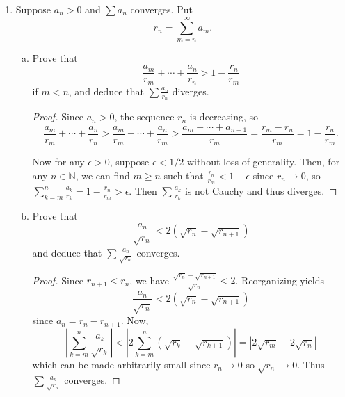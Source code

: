 \documentclass{scrbook}
\newcommand{\N}{\mathbb{N}}
\renewcommand{\to}{\rightarrow}
\begin{document}
\begin{enumerate}
\begin{enumerate}[(a)]
\item What can be said about
\[
	\sum \frac{a_n}{1 + na_n} \text{ and } \sum \frac{a_n}{1 + n^2 a_n} \text{?}
\]

\begin{proof}
The first series converges for some $a_n$ and diverges for some other $a_n$. But $\frac{a_n}{1 + n^2 a_n} < \frac{a_n}{n^2 a_n} = \frac{1}{n^2}$ so the second series converges by the comparison test and the $p$-test.
\end{proof}
\end{enumerate}

\item %
Suppose $a_n > 0$ and $\sum a_n$ converges. Put
\[
	r_n = \sum_{m=n}^{\infty} a_m.
\]
\begin{enumerate}[(a)]
\item Prove that
\[
	\frac{a_m}{r_m} + \dotsb + \frac{a_n}{r_n} > 1 - \frac{r_n}{r_m}
\]
if $m < n$, and deduce that $\sum \frac{a_n}{r_n}$ diverges.

\begin{proof}
Since $a_n > 0$, the sequence $r_n$ is decreasing, so
\[
	\frac{a_m}{r_m} + \dotsb + \frac{a_n}{r_n} > \frac{a_m}{r_m} + \dotsb + \frac{a_n}{r_m} > \frac{a_m + \dotsb + a_{n-1}}{r_m} = \frac{r_m - r_n}{r_m} = 1 - \frac{r_n}{r_m}.
\]

Now for any $\epsilon > 0$, suppose $\epsilon < 1/2$ without loss of generality. Then, for any $n \in \N$, we can find $m \ge n$ such that $\frac{r_n}{r_m} < 1 - \epsilon$ since $r_n \to 0$, so $\sum_{k=m}^{n} \frac{a_k}{r_k} = 1 - \frac{r_n}{r_m} > \epsilon$. Then $\sum \frac{a_k}{r_k}$ is not Cauchy and thus diverges.
\end{proof}
\item Prove that
\[
	\frac{a_n}{\sqrt{r_n}} < 2 (\sqrt{r_n} - \sqrt{r_{n+1}})
\]
and deduce that $\sum \frac{a_n}{\sqrt{r_n}}$ converges.

\begin{proof}
Since $r_{n+1} < r_n$, we have $\frac{\sqrt{r_n} + \sqrt{r_{n+1}}}{\sqrt{r_n}} < 2$. Reorganizing yields
\[
    \frac{a_n}{\sqrt{r_n}} < 2 (\sqrt{r_n} - \sqrt{r_{n+1}})        
\]
since $a_n = r_n - r_{n+1}$. Now,
\[
    \left|\sum_{k=m}^{n} \frac{a_k}{\sqrt{r_k}}\right| < \left|2\sum_{k=m}^{n} (\sqrt{r_k} - \sqrt{r_{k+1}})\right| = \left|2\sqrt{r_m} - 2\sqrt{r_n}\right|
\]
which can be made arbitrarily small since $r_n \to 0$ so $\sqrt{r_n} \to 0$. Thus $\sum \frac{a_n}{\sqrt{r_n}}$ converges.
\end{proof}
\end{enumerate}


\end{enumerate}
\end{document}
